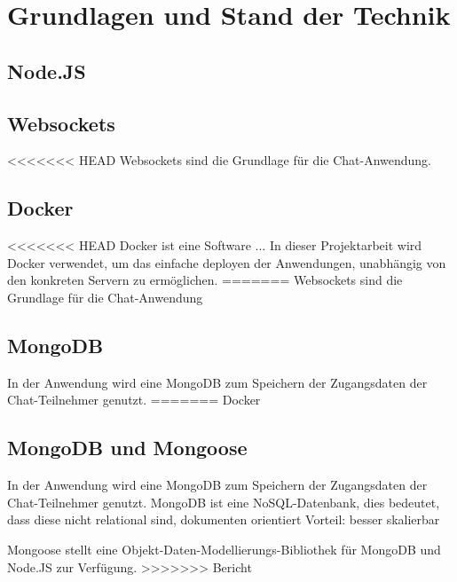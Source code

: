 
\chapter{Grundlagen und Stand der Technik}\label{cha:Grundlagen}
\section{Node.JS}\label{sec:Node.JS}

\section{Websockets}\label{sec:Websockets}
<<<<<<< HEAD
Websockets sind die Grundlage für die Chat-Anwendung.
\section{Docker}\label{sec:Docker}
<<<<<<< HEAD
Docker ist eine Software ... In dieser Projektarbeit wird Docker verwendet, um das einfache deployen der Anwendungen, unabhängig von den konkreten Servern zu ermöglichen.
=======
Websockets sind die Grundlage für die Chat-Anwendung

\section{MongoDB}\label{sec:MongoDB}
In der Anwendung wird eine MongoDB zum Speichern der Zugangsdaten der Chat-Teilnehmer genutzt.
=======
Docker 
\section{MongoDB und Mongoose}\label{sec:MongoDB}
In der Anwendung wird eine MongoDB zum Speichern der Zugangsdaten der Chat-Teilnehmer genutzt.
MongoDB ist eine NoSQL-Datenbank, dies bedeutet, dass diese nicht relational sind, dokumenten orientiert
Vorteil: besser skalierbar


Mongoose stellt eine Objekt-Daten-Modellierungs-Bibliothek für MongoDB und Node.JS zur Verfügung.
>>>>>>> Bericht
